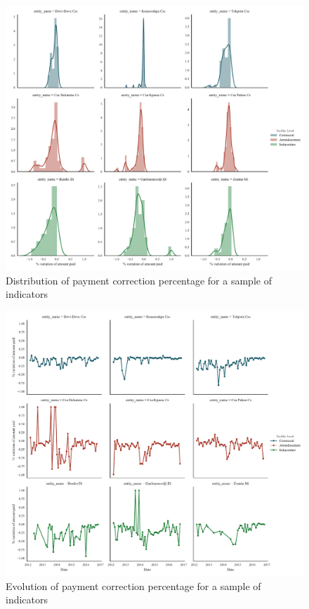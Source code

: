 \begin{center}
\begin{figure}[ht]
\includegraphics[width=\textwidth]{figure/facility_correction_distribution.pdf}
\caption{Distribution of payment correction percentage for a sample of indicators}
\label{fig:facility_correction_distribution}
\end{figure}
\end{center}

\begin{center}
\begin{figure}[ht]
\includegraphics[width=\textwidth]{figure/facility_correction_evolution.pdf}
\caption{Evolution of payment correction percentage for a sample of indicators}
\label{fig:facility_correction_evolution}
\end{figure}
\end{center}

